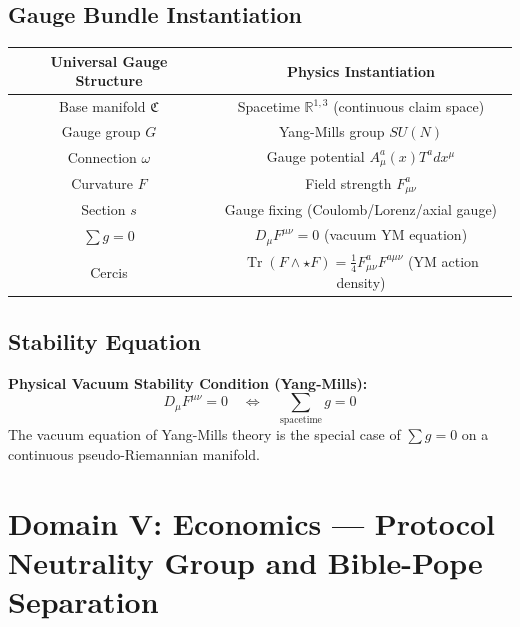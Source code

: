 \documentclass[12pt,a4paper]{article}
\theoremstyle{plain}
\theoremstyle{definition}
\newcommand{\R}{\mathbb{R}}
\newcommand{\curv}{F}
\newcommand{\conn}{\omega}
\newcommand{\ClaimSpace}{\mathfrak{C}}
\DeclareMathOperator{\Tr}{Tr}
\begin{document}
\subsection{Gauge Bundle Instantiation}

\begin{center}
\begin{tabular}{c|c}
    \toprule
    \textbf{Universal Gauge Structure} & \textbf{Physics Instantiation} \\
    \midrule
    Base manifold $\ClaimSpace$ & Spacetime $\R^{1,3}$ (continuous claim space) \\
    Gauge group $G$ & Yang-Mills group $SU(N)$ \\
    Connection $\conn$ & Gauge potential $A_\mu^a(x) T^a dx^\mu$ \\
    Curvature $\curv$ & Field strength $F_{\mu\nu}^a$ \\
    Section $s$ & Gauge fixing (Coulomb/Lorenz/axial gauge) \\
    $\sum g = 0$ & $D_\mu F^{\mu\nu} = 0$ (vacuum YM equation) \\
    Cercis & $\Tr(F \wedge \star F) = \frac{1}{4}F_{\mu\nu}^a F^{a\mu\nu}$ (YM action density) \\
    \bottomrule
\end{tabular}
\end{center}

\subsection{Stability Equation}

\begin{keyeq}
\textbf{Physical Vacuum Stability Condition (Yang-Mills):}
\begin{equation}
    \boxed{D_\mu F^{\mu\nu} = 0 \quad \Longleftrightarrow \quad \sum_{\text{spacetime}} g = 0}
\end{equation}
The vacuum equation of Yang-Mills theory is the special case of $\sum g = 0$ on a continuous pseudo-Riemannian manifold.
\end{keyeq}

\newpage


\section{Domain V: Economics — Protocol Neutrality Group and Bible-Pope Separation}
\end{document}
